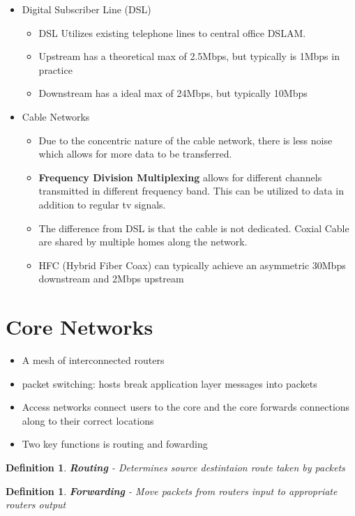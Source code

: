 \documentclass[twoside]{article}
\newtheorem{definition}[theorem]{Definition}
\begin{document}
\begin{itemize}
\item Digital Subscriber Line (DSL)
\begin{itemize}
\item DSL Utilizes existing telephone lines to central office DSLAM. 
\item Upstream has a theoretical max of 2.5Mbps, but typically is 1Mbps in practice
\item Downstream has a ideal max of 24Mbps, but typically 10Mbps
\end{itemize}
\item Cable Networks
\begin{itemize}
\item Due to the concentric nature of the cable network, there is less noise which allows for more data to be transferred.
\item \textbf{Frequency Division Multiplexing} allows for different channels transmitted in different frequency band. This can be utilized to data in addition to regular tv signals. 
\item The difference from DSL is that the cable is not dedicated. Coxial Cable are shared by multiple homes along the network. 
\item HFC (Hybrid Fiber Coax) can typically achieve an asymmetric 30Mbps downstream and 2Mbps upstream
\end{itemize}
\end{itemize}

\section{Core Networks}

\begin{itemize}
\item A mesh of interconnected routers
\item packet switching: hosts break application layer messages into packets
\item Access networks connect users to the core and the core forwards connections along to their correct locations
\item Two key functions  is routing and fowarding
\end{itemize}

\begin{definition}
\textbf{Routing } - Determines source destintaion route taken by packets
\end{definition}

\begin{definition}
\textbf{Forwarding } - Move packets from routers input to appropriate routers output
\end{definition}
\end{document}
